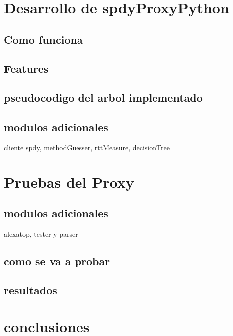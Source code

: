 \chapter{Desarrollo de spdyProxyPython}
\section{Como funciona}
\section{Features}
\section{pseudocodigo del arbol implementado}
\section{modulos adicionales}
cliente spdy, methodGuesser, rttMeasure, decisionTree
\chapter{Pruebas del Proxy}
\section{modulos adicionales}
alexatop, tester y parser
\section{como se va a probar}
\section{resultados}
\chapter{conclusiones}